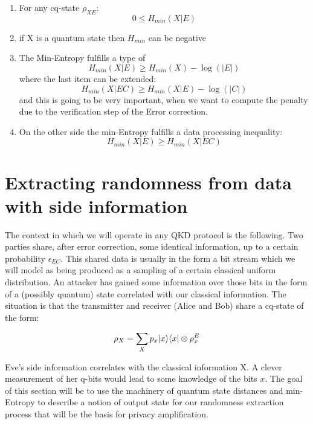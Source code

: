 \begin{enumerate}
	\item For any cq-state $\rho_{XE}$:
	      \begin{equation}
		      0 \le H_{min}(X|E)
	      \end{equation}
	\item if X is a quantum state then $H_{min}$ can be negative
	\item The Min-Entropy fulfills a type of
	      \begin{equation}
		      H_{min}(X|E) \ge H_{min}(X) - \log(|E|)
	      \end{equation}
	      where the last item can be extended:
	      \begin{equation}
		      H_{min}(X|EC) \ge H_{min}(X|E) - \log(|C|)
	      \end{equation}
	      and this is going to be very important, when we want to compute the penalty due to the verification step of the Error correction.
	\item  On the other side the min-Entropy fulfills a data processing inequality:
	      \begin{equation}
		      H_{min}(X|E) \ge H_{min}(X|EC)
	      \end{equation}
\end{enumerate}
%
\section{Extracting randomness from data with side information}

The context in which we will operate in any QKD protocol is the following. Two parties share, after error correction, some identical information, up to a certain probability $\epsilon_{EC}$. This shared data is usually in the form a bit stream which we will model as being produced as a sampling of a certain classical uniform distribution. An attacker has gained some information over those bits in the form of a (possibly quantum) state correlated with our classical information. The situation is that the transmitter and receiver (Alice and Bob) share a cq-state of the form:

\begin{equation} \label{eq:cq_state}
	\rho_X = \sum_X p_x\lvert x\rangle \langle x\rvert \otimes \rho^E_x
\end{equation}

Eve's side information correlates with the classical information X. A clever measurement of her q-bits would lead to some knowledge of the bits $x$.
The goal of this section will be to use the machinery of quantum state distances and min-Entropy to describe a notion of output state for our randomness extraction process that will be the basis for privacy amplification.

